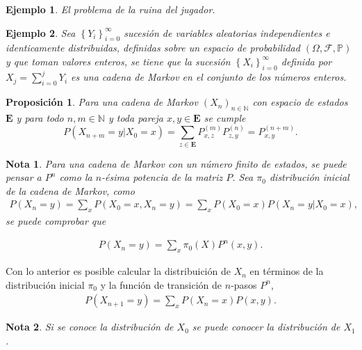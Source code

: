 \documentclass{article}
\newtheorem{Ejem}{Ejemplo}[section]
\newtheorem{Note}{Nota}[section]
\newtheorem{Prop}{Proposición}[section]
\newcommand{\nat}{\mathbb{N}}
\newcommand{\Eb}{\mathbf{E}}
\newcommand{\prob}{\mathbb{P}}
\numberwithin{equation}{section}
\begin{document}
\begin{Ejem}
El problema de la ruina del jugador.
\end{Ejem}

\begin{Ejem}
Sea $\left\{Y_{i}\right\}_{i=0}^{\infty}$ sucesi\'on de variables aleatorias independientes e identicamente distribuidas, definidas sobre un espacio de probabilidad $\left(\Omega,\mathcal{F},\prob\right)$ y que toman valores enteros, se tiene que la sucesi\'on $\left\{X_{i}\right\}_{i=0}^{\infty}$ definida por $X_{j}=\sum_{i=0}^{j}Y_{i}$ es una cadena de Markov en el conjunto de los n\'umeros enteros.
\end{Ejem}

\begin{Prop}
Para una cadena de Markov $\left(X_{n}\right)_{n\in\nat}$ con espacio de estados $\Eb$ y para todo $n,m\in \nat$ y toda pareja $x,y\in\Eb$ se cumple
\begin{equation}
P\left(X_{n+m}=y|X_{0}=x\right)=\sum_{z\in\Eb}P_{x,z}^{(m)}P_{z,y}^{(n)}=P_{x,y}^{(n+m)}.
\end{equation}
\end{Prop}

\begin{Note}
Para una cadena de Markov con un n\'umero finito de estados, se puede pensar a $P^{n}$ como la $n$-\'esima potencia de la matriz $P$. Sea $\pi_{0}$ distribuci\'on inicial de la cadena de Markov, como 
\begin{eqnarray}
P\left(X_{n}=y\right)=\sum_{x} P\left(X_{0}=x,X_{n}=y\right)=\sum_{x} P\left(X_{0}=x\right)P\left(X_{n}=y|X_{0}=x\right),
\end{eqnarray}
se puede comprobar que 

\begin{eqnarray}
P\left(X_{n}=y\right)=\sum_{x} \pi_{0}\left(X\right)P^{n}\left(x,y\right).
\end{eqnarray}
\end{Note}

Con lo anterior es posible calcular la distribuici\'on de $X_{n}$ en t\'erminos de la distribuci\'on inicial $\pi_{0}$ y la funci\'on de transici\'on de $n$-pasos $P^{n}$,
\begin{eqnarray}
P\left(X_{n+1}=y\right)=\sum_{x} P\left(X_{n}=x\right)P\left(x,y\right).
\end{eqnarray}
\begin{Note}
Si se conoce la distribuci\'on de $X_{0}$ se puede conocer la distribuci\'on de $X_{1}$.
\end{Note}
\end{document}
